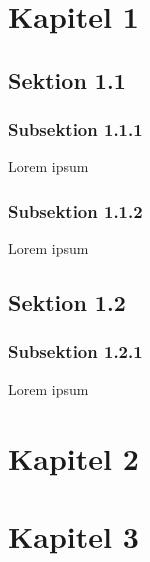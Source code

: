 \documentclass[11pt]{scrreprt}
\begin{document}
\begin{titlepage}
		\centering
		
\end{titlepage}

\tableofcontents

\chapter{Kapitel 1}

\section{Sektion 1.1}

\subsection{Subsektion 1.1.1}
\label{sec:Subsektion 1.1.1}
Lorem ipsum

\subsection{Subsektion 1.1.2}
Lorem ipsum\\

\section{Sektion 1.2}
\subsection{Subsektion 1.2.1}
Lorem ipsum

\chapter{Kapitel 2}
\chapter{Kapitel 3}
\end{document}
